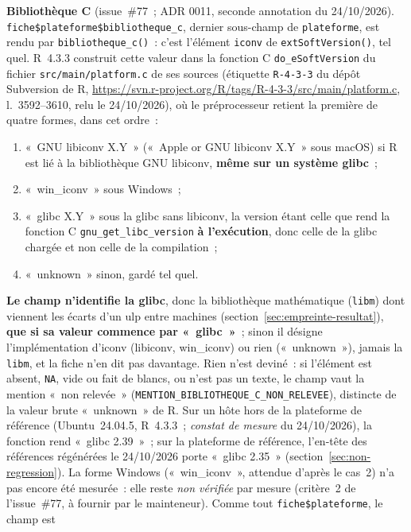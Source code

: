 \documentclass[a4paper,11pt]{article}
\newcommand{\code}[1]{\texttt{\small #1}}
\begin{document}
\medskip
\begingroup\sloppy
\noindent
\textbf{Bibliothèque C} (issue~\#77~; ADR 0011, seconde annotation du
24/10/2026). \code{fiche\$plateforme\$}\allowbreak\code{bibliotheque\_c}, dernier
sous-champ de \code{plateforme}, est rendu par \code{bibliotheque\_c()}~:
c'est l'élément \code{iconv} de \code{extSoftVersion()}, tel quel. R~4.3.3
construit cette valeur dans la fonction C \code{do\_eSoftVersion} du
fichier \code{src/main/platform.c} de ses sources (étiquette
\code{R-4-3-3} du dépôt Subversion de R,
\url{https://svn.r-project.org/R/tags/R-4-3-3/src/main/platform.c},
l.~3592--3610, relu le 24/10/2026), où le préprocesseur retient la
première de quatre formes, dans cet ordre~:
\begin{enumerate}[leftmargin=*, itemsep=1pt]
  \item «~GNU libiconv X.Y~» («~Apple or GNU libiconv X.Y~» sous macOS) si
    R est lié à la bibliothèque GNU libiconv, \textbf{même sur un système
    glibc}~;
  \item «~win\_iconv~» sous Windows~;
  \item «~glibc X.Y~» sous la glibc sans libiconv, la version étant celle
    que rend la fonction C \code{gnu\_get\_libc\_version} \textbf{à
    l'exécution}, donc celle de la glibc chargée et non celle de la
    compilation~;
  \item «~unknown~» sinon, gardé tel quel.
\end{enumerate}
\textbf{Le champ n'identifie la glibc}, donc la bibliothèque mathématique
(\code{libm}) dont viennent les écarts d'un ulp entre machines
(section~\ref{sec:empreinte-resultat}), \textbf{que si sa valeur commence
par «~glibc~»}~; sinon il désigne l'implémentation d'iconv (libiconv,
win\_iconv) ou rien («~unknown~»), jamais la \code{libm}, et la fiche n'en
dit pas davantage. Rien n'est deviné~: si l'élément est absent,
\code{NA}, vide ou fait de blancs, ou n'est pas un texte, le champ vaut la
mention «~non relevée~»
(\code{MENTION\_BIBLIOTHEQUE\_C\_NON\_RELEVEE}), distincte de la valeur
brute «~unknown~» de R. Sur un hôte hors de la plateforme de référence
(Ubuntu~24.04.5, R~4.3.3~; \emph{constat de mesure} du 24/10/2026), la
fonction rend «~glibc 2.39~»~; sur la plateforme de référence, l'en-tête
des références régénérées le 24/10/2026 porte «~glibc 2.35~»
(section~\ref{sec:non-regression}). La forme Windows («~win\_iconv~»,
attendue d'après le cas~2) n'a pas encore été mesurée~: elle reste
\emph{non vérifiée} par mesure (critère~2 de l'issue~\#77, à fournir par le
mainteneur). Comme tout \code{fiche\$plateforme}, le champ est
\end{document}
